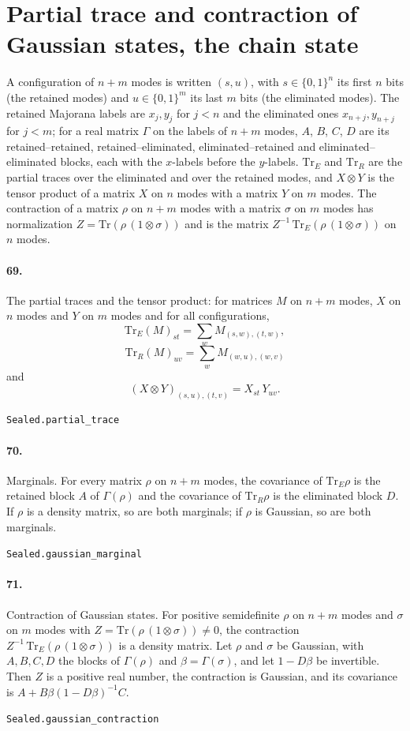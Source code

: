 \documentclass[11pt]{article}
\begin{document}
\section*{Partial trace and contraction of Gaussian states, the chain state}
A configuration of $n + m$ modes is written $(s, u)$, with $s \in \{0,1\}^n$ its first $n$ bits (the retained modes) and $u \in \{0,1\}^m$ its last $m$ bits (the eliminated modes). The retained Majorana labels are $x_j, y_j$ for $j < n$ and the eliminated ones $x_{n+j}, y_{n+j}$ for $j < m$; for a real matrix $\Gamma$ on the labels of $n + m$ modes, $A$, $B$, $C$, $D$ are its retained–retained, retained–eliminated, eliminated–retained and eliminated–eliminated blocks, each with the $x$-labels before the $y$-labels. $\mathrm{Tr}_E$ and $\mathrm{Tr}_R$ are the partial traces over the eliminated and over the retained modes, and $X \otimes Y$ is the tensor product of a matrix $X$ on $n$ modes with a matrix $Y$ on $m$ modes. The contraction of a matrix $\rho$ on $n + m$ modes with a matrix $\sigma$ on $m$ modes has normalization $Z = \mathrm{Tr}(\rho\,(1 \otimes \sigma))$ and is the matrix $Z^{-1}\,\mathrm{Tr}_E(\rho\,(1 \otimes \sigma))$ on $n$ modes.

\paragraph{69.} The partial traces and the tensor product: for matrices $M$ on $n + m$ modes, $X$ on $n$ modes and $Y$ on $m$ modes and for all configurations, \[\mathrm{Tr}_E(M)_{st} = \sum_w M_{(s,w),(t,w)},\] \[\mathrm{Tr}_R(M)_{uv} = \sum_w M_{(w,u),(w,v)}\] and \[(X \otimes Y)_{(s,u),(t,v)} = X_{st}\,Y_{uv}.\]\par{\footnotesize\texttt{Sealed.partial\_trace}}

\paragraph{70.} Marginals. For every matrix $\rho$ on $n + m$ modes, the covariance of $\mathrm{Tr}_E\rho$ is the retained block $A$ of $\Gamma(\rho)$ and the covariance of $\mathrm{Tr}_R\rho$ is the eliminated block $D$. If $\rho$ is a density matrix, so are both marginals; if $\rho$ is Gaussian, so are both marginals.\par{\footnotesize\texttt{Sealed.gaussian\_marginal}}

\paragraph{71.} Contraction of Gaussian states. For positive semidefinite $\rho$ on $n + m$ modes and $\sigma$ on $m$ modes with $Z = \mathrm{Tr}(\rho\,(1 \otimes \sigma)) \ne 0$, the contraction $Z^{-1}\,\mathrm{Tr}_E(\rho\,(1 \otimes \sigma))$ is a density matrix. Let $\rho$ and $\sigma$ be Gaussian, with $A, B, C, D$ the blocks of $\Gamma(\rho)$ and $\beta = \Gamma(\sigma)$, and let $1 - D\beta$ be invertible. Then $Z$ is a positive real number, the contraction is Gaussian, and its covariance is $A + B\beta(1 - D\beta)^{-1}C$.\par{\footnotesize\texttt{Sealed.gaussian\_contraction}}
\end{document}
